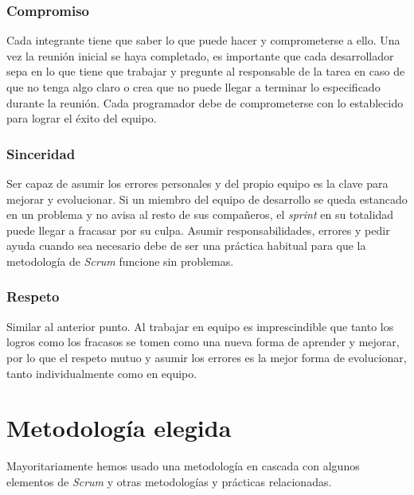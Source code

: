 \subsubsection{Compromiso}

Cada integrante tiene que saber lo que puede hacer y comprometerse a ello. Una vez la reunión inicial se haya completado, es importante que cada desarrollador sepa en lo que tiene que trabajar y pregunte al responsable de la tarea en caso de que no tenga algo claro o crea que no puede llegar a terminar lo especificado durante la reunión. Cada programador debe de comprometerse con lo establecido para lograr el éxito del equipo.

\subsubsection{Sinceridad}

Ser capaz de asumir los errores personales y del propio equipo es la clave para mejorar y evolucionar. Si un miembro del equipo de desarrollo se queda estancado en un problema y no avisa al resto de sus compañeros, el \textit{sprint} en su totalidad puede llegar a fracasar por su culpa. Asumir responsabilidades, errores y pedir ayuda cuando sea necesario debe de ser una práctica habitual para que la metodología de \textit{Scrum} funcione sin problemas.

\subsubsection{Respeto}

Similar al anterior punto. Al trabajar en equipo es imprescindible que tanto los logros como los fracasos se tomen como una nueva forma de aprender y mejorar, por lo que el respeto mutuo y asumir los errores es la mejor forma de evolucionar, tanto individualmente como en equipo.

\section{Metodología elegida}
\label{sec:metodologiaelegida}

Mayoritariamente hemos usado una metodología en cascada con algunos elementos de \textit{Scrum} y otras metodologías y prácticas relacionadas.

